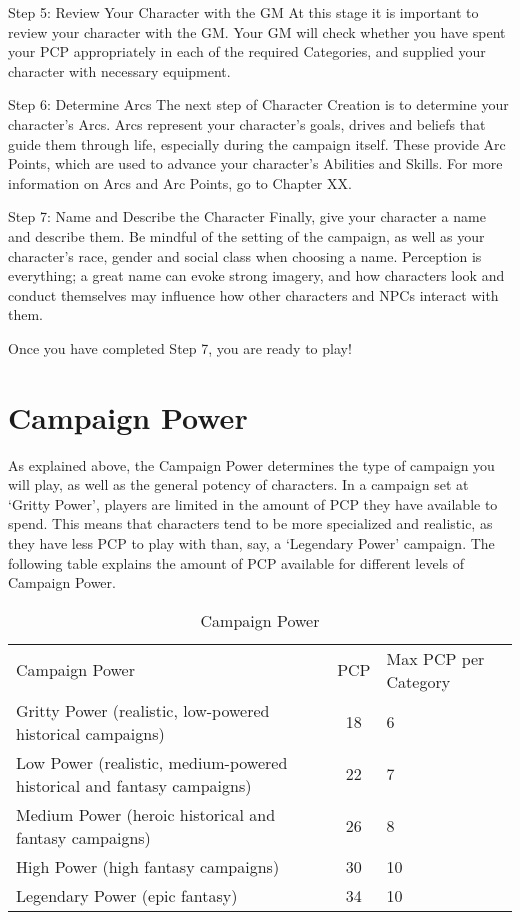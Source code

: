 \documentclass[oneside,11pt,english]{book}
\begin{document}
 


Step 5: Review Your Character with the GM 
At this stage it is important to review your character with the GM. Your GM will check whether you have 
spent your PCP appropriately in each of the required Categories, and supplied your character with 
necessary equipment. 

 

Step 6: Determine Arcs 
The next step of Character Creation is to determine your character’s Arcs. Arcs represent your character’s 
goals, drives and beliefs that guide them through life, especially during the campaign itself. These provide 
Arc Points, which are used to advance your character’s Abilities and Skills. For more information on Arcs 
and Arc Points, go to Chapter XX. 

 

Step 7: Name and Describe the Character 
Finally, give your character a name and describe them. Be mindful of the setting of the campaign, as well 
as your character’s race, gender and social class when choosing a name. Perception is everything; a great 
name can evoke strong imagery, and how characters look and conduct themselves may influence how 
other characters and NPCs interact with them. 

 

Once you have completed Step 7, you are ready to play! 

 

\section{Campaign Power}
As explained above, the Campaign Power determines the type of campaign you will play, as well as the 
general potency of characters. In a campaign set at ‘Gritty Power’, players are limited in the amount of 
PCP they have available to spend. This means that characters tend to be more specialized and realistic, as 
they have less PCP to play with than, say, a ‘Legendary Power’ campaign. The following table explains 
the amount of PCP available for different levels of Campaign Power. 

\begin{table}[h]
\caption{Campaign Power}
\noindent\begin{tabu} to \textwidth {X[l,2] c X[c]}
Campaign Power & PCP & Max PCP per Category\\
Gritty Power (realistic, low-powered historical campaigns) & 18 & 6 \\
Low Power (realistic, medium-powered historical and fantasy campaigns) & 22 & 7 \\
Medium Power (heroic historical and fantasy campaigns) & 26 & 8 \\
High Power (high fantasy campaigns) & 30 & 10 \\
Legendary Power (epic fantasy) & 34 & 10 \\
\end{tabu} 
\label{tab:campaign_power}
\end{table}
\end{document}
